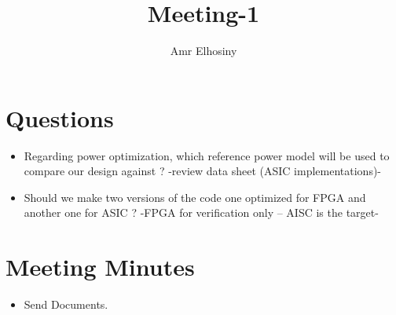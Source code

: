 \documentclass[11pt,a4paper]{article}
\author{Amr Elhosiny}
\begin{document}
\title{Meeting-1}

\maketitle

\section{Questions}
\begin{itemize}
	\item Regarding power optimization, which reference power model will be used to compare our design against ?  -review data sheet (ASIC implementations)-
	\item Should we make two versions of the code one optimized for FPGA and another one for ASIC ? -FPGA for verification only -- AISC is the target-
\end{itemize}

\section{Meeting Minutes}
\begin{itemize}
	\item Send Documents.
\end{itemize}
\end{document}
